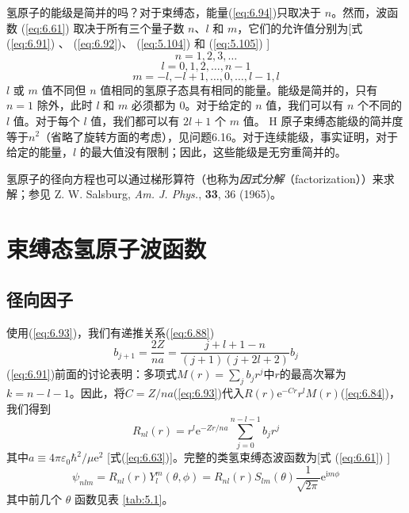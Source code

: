     氢原子的能级是简并的吗？对于束缚态，能量(\ref{eq:6.94})只取决于 $n$。然而，波函数 (\ref{eq:6.61}) 取决于所有三个量子数 $n$、$l$ 和 $m$，它们的允许值分别为[式 (\ref{eq:6.91}) 、 (\ref{eq:6.92})、 (\ref{eq:5.104})  和 (\ref{eq:5.105}) ]
    \begin{equation}
        \boxed{
            n = 1,2,3,\ldots
        }
        \label{eq:6.96}
    \end{equation}
    \begin{equation}
        \boxed{
            l = 0,1,2,\ldots,n-1
        }
        \label{eq:6.97}
    \end{equation}
    \begin{equation}
        \boxed{
            m = -l,-l+1,\ldots,0,\ldots,l-1,l
        }
        \label{eq:6.98}
    \end{equation}
    $l$ 或 $m$ 值不同但 $n$ 值相同的氢原子态具有相同的能量。能级是简并的，只有 $n=1$ 除外，此时 $l$ 和 $m$ 必须都为 0。对于给定的 $n$ 值，我们可以有 $n$ 个不同的 $l$ 值。对于每个 $l$ 值，我们都可以有 $2l+1$ 个 $m$ 值。 H 原子束缚态能级的简并度等于$n^2$（省略了旋转方面的考虑），见问题6.16。对于连续能级，事实证明，对于给定的能量，$l$ 的最大值没有限制；因此，这些能级是无穷重简并的。

    氢原子的径向方程也可以通过梯形算符（也称为\textit{因式分解}（factorization））来求解；参见 Z. W. Salsburg, \textit{Am. J. Phys.}, \textbf{33}, 36 (1965)。

\section{束缚态氢原子波函数}
\label{sec:6.6 The Bound-State Hydrogen-Atom Wave Functions}

\subsection*{径向因子}
    使用(\ref{eq:6.93})，我们有递推关系(\ref{eq:6.88})
    \begin{equation}
        b_{j+1} = \frac{2Z}{na} = \frac{j+l+1-n}{\left(j+1\right)\left(j+2l+2\right)}b_j
        \label{eq:6.99}
    \end{equation}
    (\ref{eq:6.91})前面的讨论表明：多项式$M\left(r\right) = \sum_{j}b_jr^j$中$r$的最高次幂为$k = n-l-1$。因此，将$C = Z/na$(\ref{eq:6.93})代入$R\left(r\right) \mathrm{e}^{-Cr}r^lM\left(r\right)$(\ref{eq:6.84})，我们得到
    \begin{equation}
        R_{nl}\left(r\right) = r^l\mathrm{e}^{-Zr/na}\sum_{j=0}^{n-l-1}b_jr^j
        \label{eq:6.100}
    \end{equation}
    其中$a \equiv 4\pi\varepsilon_0\hbar^2/\mu\mathrm{e}^2$ [式(\ref{eq:6.63})]。完整的类氢束缚态波函数为[式 (\ref{eq:6.61}) ]
    \begin{equation}
        \psi_{nlm} = R_{nl}\left(r\right)Y_l^m\left(\theta,\phi\right) = R_{nl}\left(r\right)S_{lm}\left(\theta\right)\frac{1}{\sqrt{2\pi}}\mathrm{e}^{\mathrm{i}m\phi}
        \label{eq:6.101}
    \end{equation}
    其中前几个 $\theta$ 函数见表 \ref{tab:5.1}。

